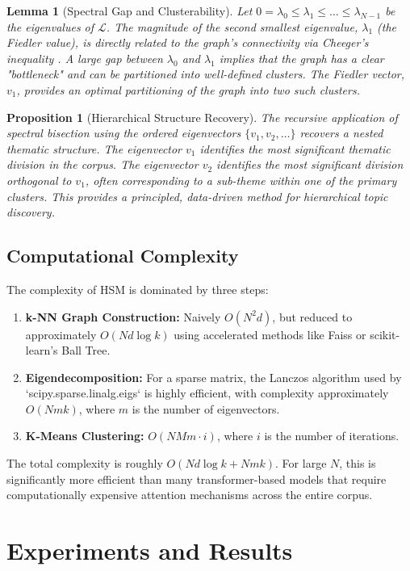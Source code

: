 \documentclass[conference]{IEEEtran}
\newtheorem{lemma}[theorem]{Lemma}
\newtheorem{proposition}[theorem]{Proposition}
\theoremstyle{definition}
\begin{document}
\begin{lemma}[Spectral Gap and Clusterability]
Let $0 = \lambda_0 \le \lambda_1 \le \dots \le \lambda_{N-1}$ be the eigenvalues of $\mathcal{L}$. The magnitude of the second smallest eigenvalue, $\lambda_1$ (the Fiedler value), is directly related to the graph's connectivity via Cheeger's inequality \cite{cheeger1970lower}. A large gap between $\lambda_0$ and $\lambda_1$ implies that the graph has a clear "bottleneck" and can be partitioned into well-defined clusters. The Fiedler vector, $v_1$, provides an optimal partitioning of the graph into two such clusters.
\end{lemma}

\begin{proposition}[Hierarchical Structure Recovery]
The recursive application of spectral bisection using the ordered eigenvectors $\{v_1, v_2, \dots\}$ recovers a nested thematic structure. The eigenvector $v_1$ identifies the most significant thematic division in the corpus. The eigenvector $v_2$ identifies the most significant division orthogonal to $v_1$, often corresponding to a sub-theme within one of the primary clusters. This provides a principled, data-driven method for hierarchical topic discovery.
\end{proposition}

\subsection{Computational Complexity}
The complexity of HSM is dominated by three steps:
\begin{enumerate}
    \item \textbf{k-NN Graph Construction:} Naively $O(N^2 d)$, but reduced to approximately $O(Nd \log k)$ using accelerated methods like Faiss or scikit-learn's Ball Tree.
    \item \textbf{Eigendecomposition:} For a sparse matrix, the Lanczos algorithm used by `scipy.sparse.linalg.eigs` is highly efficient, with complexity approximately $O(Nmk)$, where $m$ is the number of eigenvectors.
    \item \textbf{K-Means Clustering:} $O(NMm \cdot i)$, where $i$ is the number of iterations.
\end{enumerate}
The total complexity is roughly $O(Nd \log k + Nmk)$. For large $N$, this is significantly more efficient than many transformer-based models that require computationally expensive attention mechanisms across the entire corpus.

\section{Experiments and Results}
\end{document}
